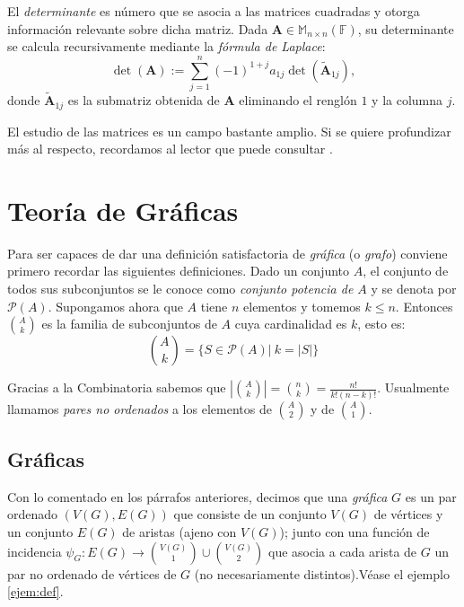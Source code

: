             El \textit{determinante}  es número que se asocia a las matrices cuadradas y otorga información relevante sobre dicha matriz. Dada $\mathbf{A} \in \mathbb{M}_{n \times n} (\mathbb{F})$, su determinante se calcula recursivamente mediante la \textit{fórmula de Laplace}:
            $$
            \det(\mathbf{A}):= \sum_{j=1}^{n} (-1)^{1+j} a_{1j} \det(\widetilde{\mathbf{A}}_{1j}),
            $$ donde $\widetilde{\mathbf{A}}_{1j}$ es la submatriz obtenida de $\mathbf{A}$ eliminando el renglón $1$ y la columna $j$.
            
            El estudio de las matrices es un campo bastante amplio. Si se quiere profundizar más al respecto, recordamos al lector que puede consultar  \cite{Friedberg,Noble,Zhang, Shores}.

        \section{Teoría de Gráficas}

        Para ser capaces de dar una definición satisfactoria de \textit{gráfica} (o \textit{grafo}) conviene primero recordar las siguientes definiciones. Dado un conjunto $A$, el conjunto de todos sus subconjuntos se le conoce como \textit{conjunto potencia de $A$} y se denota por $\mathcal{P}(A)$. Supongamos ahora que $A$ tiene $n$ elementos y tomemos $k \leq n$. Entonces $\binom{A}{k}$ es la familia de subconjuntos de $A$ cuya cardinalidad es $k$, esto es:
        $$ \binom{A}{k} = \Big\{ S \in \mathcal{P}(A) \Big| \: k = |S| \Big\} $$
        
        Gracias a la Combinatoria sabemos que $\left | \binom{A}{k} \right | = \binom{n}{k} = \frac{n!}{k! (n -k)!}$. Usualmente llamamos \textit{pares no ordenados} a los elementos de $\binom{A}{2}$ y de $\binom{A}{1}$.

        \subsection{Gráficas} \label{sec:queesunagrafica}

            Con lo comentado en los párrafos anteriores, decimos que una \textit{gráfica}  $G$ es un par ordenado $(V(G), E(G))$ que consiste de un conjunto $V(G)$ de \textnormal{vértices}  y un conjunto $E(G)$ de \textnormal{aristas} (ajeno con $V(G)$); junto con una \textnormal{función de incidencia} $\psi_{G} \colon E(G) \rightarrow \binom{V(G)}{1} \cup \binom{V(G)}{2}$ que asocia a cada arista de $G$ un par no ordenado de vértices de $G$ (no necesariamente distintos).Véase el ejemplo \ref{ejem:def}.

